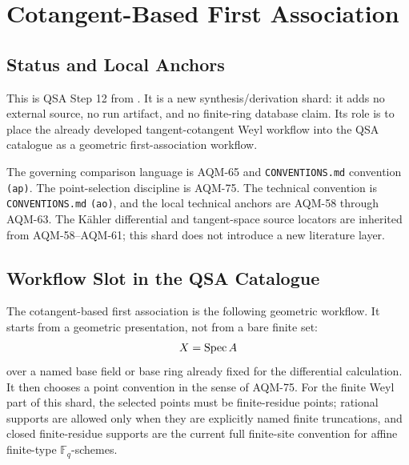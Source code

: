 
\section{Cotangent-Based First Association}
\label{sec:qsa-cotangent-first-association}

\subsection{Status and Local Anchors}

This is QSA Step 12 from
.  It is a new
synthesis/derivation shard: it adds no external source, no run artifact, and
no finite-ring database claim.  Its role is to place the already developed
tangent-cotangent Weyl workflow into the QSA catalogue as a geometric
first-association workflow.

The governing comparison language is AQM-65 and \texttt{CONVENTIONS.md}
convention \texttt{(ap)}.  The point-selection discipline is AQM-75.  The
technical convention is \texttt{CONVENTIONS.md} \texttt{(ao)}, and the local
technical anchors are AQM-58 through AQM-63.  The K\"ahler differential and
tangent-space source locators are inherited from AQM-58--AQM-61; this shard
does not introduce a new literature layer.

\subsection{Workflow Slot in the QSA Catalogue}

The cotangent-based first association is the following geometric workflow.
It starts from a geometric presentation, not from a bare finite set:
\[
  X=\operatorname{Spec} A
\]
over a named base field or base ring already fixed for the differential
calculation.  It then chooses a point convention in the sense of AQM-75.  For
the finite Weyl part of this shard, the selected points must be
finite-residue points; rational supports are allowed only when they are
explicitly named finite truncations, and closed finite-residue supports are
the current full finite-site convention for affine finite-type
\(\mathbb F_q\)-schemes.

